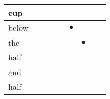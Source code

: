 \documentclass[landscape]{article}
\newcommand{\ssp}{\hspace{2pt}}
\newcommand{\mex}{\cellcolor{g}$\bullet$}
\begin{document}
\begin{tabular}{|l|p{10pt}|p{10pt}|p{10pt}|p{10pt}|p{10pt}|p{10pt}|p{10pt}|p{10pt}|}
\hline
\ssp cup \ssp&\hspace{2pt}&\hspace{2pt}&\hspace{2pt}&\hspace{2pt}&\hspace{2pt}&\hspace{2pt}&\hspace{2pt}&\hspace{2pt}\\
\hline
\ssp \cellcolor{ref4}below \ssp&\hspace{2pt}&\hspace{2pt}&\hspace{2pt}&\hspace{2pt}&\hspace{2pt}\mex&\hspace{2pt}&\hspace{2pt}&\hspace{2pt}\\
\hline
\ssp \cellcolor{ref5}the \ssp&\hspace{2pt}&\hspace{2pt}&\hspace{2pt}&\hspace{2pt}&\hspace{2pt}&\hspace{2pt}\mex&\hspace{2pt}&\hspace{2pt}\\
\hline
\ssp half \ssp&\hspace{2pt}&\hspace{2pt}&\hspace{2pt}&\hspace{2pt}&\hspace{2pt}&\hspace{2pt}&\hspace{2pt}&\hspace{2pt}\\
\hline
\ssp and \ssp&\hspace{2pt}&\hspace{2pt}&\hspace{2pt}&\hspace{2pt}&\hspace{2pt}&\hspace{2pt}&\hspace{2pt}&\hspace{2pt}\\
\hline
\ssp half \ssp&\hspace{2pt}&\hspace{2pt}&\hspace{2pt}&\hspace{2pt}&\hspace{2pt}&\hspace{2pt}&\hspace{2pt}&\hspace{2pt}\\

\end{tabular}
\end{document}
